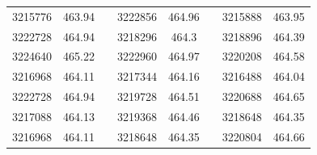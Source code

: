 \documentclass[12pt]{mwart}
\begin{document}
\begin{table}[H]
\begin{tabular}{cclcclcc}
		3215776                                                  & 463.94                                                        &  & 3222856                                                  & 464.96                                                        &  & 3215888                                                  & 463.95                                                        \\
		3222728                                                  & 464.94                                                        &  & 3218296                                                  & 464.3                                                         &  & 3218896                                                  & 464.39                                                        \\
		3224640                                                  & 465.22                                                        &  & 3222960                                                  & 464.97                                                        &  & 3220208                                                  & 464.58                                                        \\
		3216968                                                  & 464.11                                                        &  & 3217344                                                  & 464.16                                                        &  & 3216488                                                  & 464.04                                                        \\
		3222728                                                  & 464.94                                                        &  & 3219728                                                  & 464.51                                                        &  & 3220688                                                  & 464.65                                                        \\
		3217088                                                  & 464.13                                                        &  & 3219368                                                  & 464.46                                                        &  & 3218648                                                  & 464.35                                                        \\
		3216968                                                  & 464.11                                                        &  & 3218648                                                  & 464.35                                                        &  & 3220804                                                  & 464.66                                                        \\

\end{tabular}
\end{table}
\end{document}
